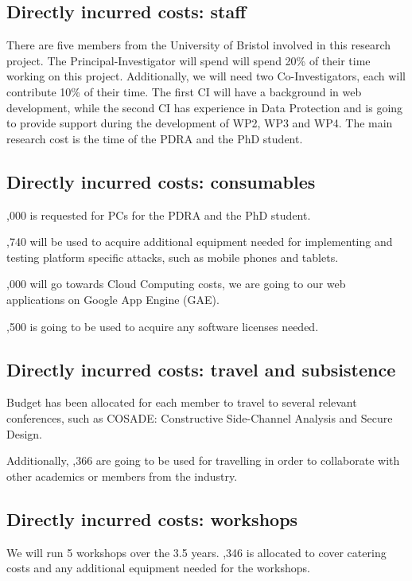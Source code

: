 \documentclass[a4paper,11pt]{article}
\begin{document}
\subsection*{Directly incurred costs: staff}
There are five members from the University of Bristol involved in this research project. The Principal-Investigator will spend will spend 20\% of their time working on this project. Additionally, we will need two Co-Investigators, each will contribute 10\% of their time. The first CI will have a background in web development, while the second CI has experience in Data Protection and is going to provide support during the development of WP2, WP3 and WP4. The main research cost is the time of the PDRA and the PhD student.

\subsection*{Directly incurred costs: consumables}
,000 is requested for PCs for the PDRA and the PhD student.

,740 will be used to acquire additional equipment needed for implementing and testing platform specific attacks, such as mobile phones and tablets.

,000 will go towards Cloud Computing costs, we are going to our web applications on Google App Engine (GAE).

,500 is going to be used to acquire any software licenses needed.

\subsection*{Directly incurred costs: travel and subsistence}
Budget has been allocated for each member to travel to several relevant conferences, such as COSADE: Constructive Side-Channel Analysis and Secure Design.

Additionally, ,366 are going to be used for travelling in order to collaborate with other academics or members from the industry.

\subsection*{Directly incurred costs: workshops}
We will run 5 workshops over the 3.5 years. ,346 is allocated to cover catering costs and any additional equipment needed for the workshops.
 
\end{document}
